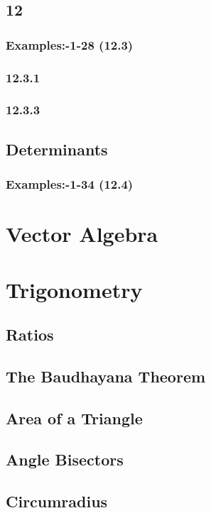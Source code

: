 \documentclass[11pt]{book}
\begin{document}
\section{12}
\subsection{Examples:-1-28 (12.3)}

\subsection{12.3.1}

\subsection{12.3.3}

\section{Determinants}
\subsection{Examples:-1-34 (12.4)}

\chapter{Vector Algebra}
\chapter{Trigonometry}
\section{Ratios}

\section{The Baudhayana Theorem}

%
\section{Area of a Triangle}

\section{Angle Bisectors}

\section{Circumradius}

\end{document}
